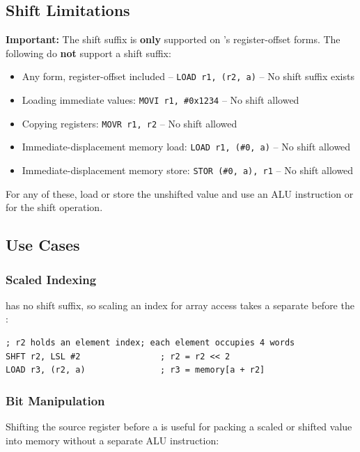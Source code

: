 \subsection{Shift Limitations}

\textbf{Important:} The shift suffix is \textbf{only} supported on 's register-offset forms. The
following do \textbf{not} support a shift suffix:
\begin{itemize}
	\item Any  form, register-offset included -- \texttt{LOAD r1, (r2, a)} -- No shift suffix exists
	\item Loading immediate values: \texttt{MOVI r1, \#0x1234} -- No shift allowed
	\item Copying registers: \texttt{MOVR r1, r2} -- No shift allowed
	\item Immediate-displacement memory load: \texttt{LOAD r1, (\#0, a)} -- No shift allowed
	\item Immediate-displacement memory store: \texttt{STOR (\#0, a), r1} -- No shift allowed
\end{itemize}

For any of these, load or store the unshifted value and use an ALU instruction or  for the shift
operation.

\subsection{Use Cases}

\subsubsection{Scaled Indexing}

 has no shift suffix, so scaling an index for array access takes a separate  before the
:

\begin{lstlisting}
; r2 holds an element index; each element occupies 4 words
SHFT r2, LSL #2                ; r2 = r2 << 2
LOAD r3, (r2, a)               ; r3 = memory[a + r2]
\end{lstlisting}

\subsubsection{Bit Manipulation}

Shifting the source register before a  is useful for packing a scaled or shifted value into memory
without a separate ALU instruction:

